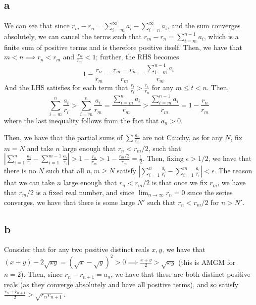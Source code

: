 \documentclass[12pt,letterpaper]{article}
\theoremstyle{definition}
\begin{document}
\subsection*{a}

We can see that since $r_{m} - r_{n} = \sum_{i=m}^{\infty}a_{i} - \sum_{i=n}^{\infty}a_{i}$, and the sum converges absolutely, we can cancel the terms such that $r_{m} - r_{n} = \sum_{i=m}^{n-1}a_{i}$, which is a finite sum of positive terms and is therefore positive itself. Then, we have that $m < n \implies r_{n} < r_{m}$ and $\frac{r_{n}}{r_{m}} < 1$; further, the RHS becomes
\[
  1 - \frac{r_{n}}{r_{m}} = \frac{r_{m} - r_{n}}{r_{m}} = \frac{\sum_{i=m}^{n-1}a_{i}}{r_{m}}
\]
And the LHS satisfies for each term that $\frac{r_{t}}{r_{t}} > \frac{r_{t}}{r_{n}}$ for any $m \leq t < n$. Then,
\[
  \sum_{i=m}^{n}\frac{a_{i}}{r_{i}} > \sum_{i=m}^{n}\frac{a_{i}}{r_{m}} = \frac{\sum_{i=m}^{n}a_{i}}{r_{m}} > \frac{\sum_{i=m}^{n-1}a_{i}}{r_{m}} = 1 - \frac{r_{n}}{r_{m}}
\]
where the last inequality follows from the fact that $a_{n} > 0$.

Then, we have that the partial sums of $\sum \frac{a_{n}}{r_{n}}$ are not Cauchy, as for any $N$, fix $m = N$ and take $n$ large enough that $r_{n} < r_{m} / 2$, such that $|\sum_{i=1}^{n}\frac{a_{i}}{r_{i}} - \sum_{i=1}^{m-1}\frac{a_{i}}{r_{i}}| > 1 - \frac{r_{n}}{r_{m}} > 1 - \frac{r_{m}/2}{r_{m}} = \frac{1}{2}$. Then, fixing $\epsilon > 1/2$, we have that there is no $N$ such that all $n,m \geq N$ satisfy $|\sum_{i=1}^{n}\frac{a_{i}}{r_{i}} - \sum_{i=1}^{m}\frac{a_{i}}{r_{i}}| < \epsilon$. The reason that we can take $n$ large enough that $r_{n} < r_{m} / 2$ is that once we fix $r_{m}$, we have that $r_{m}/2$ is a fixed real number, and since $\lim_{n \rightarrow \infty}r_{n} = 0$ since the series converges, we have that there is some large $N'$ such that $r_{n} < r_{m}/2$ for $n > N'$.

\subsection*{b}

Consider that for any two positive distinct reals $x,y$, we have that $(x+y) - 2\sqrt{xy} = (\sqrt{x} - \sqrt{y})^{2} > 0 \implies \frac{x + y}{2} > \sqrt{xy}$ (this is AMGM for $n = 2$). Then, since $r_{n}-r_{n+1} = a_{n}$, we have that these are both distinct positive reals (as they converge absolutely and have all positive terms), and so satisfy $\frac{r_{n} + r_{n+1}}{2} > \sqrt{r_{n}r_{n+1}}$.
\end{document}
